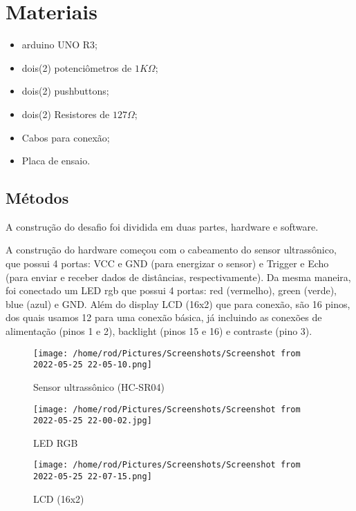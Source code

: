 \documentclass[conference]{IEEEtran}
\begin{document}
\section{Materiais}
 \begin{itemize}
     \item arduino UNO R3;
     \item dois(2) potenciômetros de $ 1K\Omega $;
     \item dois(2) pushbuttons;
     \item dois(2) Resistores de $ 127\Omega $;
     \item Cabos para conexão;
     \item Placa de ensaio.
 \end{itemize}

\subsection{Métodos}
A construção do desafio foi dividida em duas partes, hardware e software. 

A construção do hardware começou com o cabeamento do sensor ultrassônico, que possui 4 portas: VCC e GND (para
energizar o sensor) e Trigger e Echo (para enviar e receber dados de distâncias, respectivamente). Da mesma maneira,
foi conectado um LED rgb que possui 4 portas: red (vermelho), green (verde), blue (azul) e GND. Além do display LCD (16x2)
que para conexão, são 16 pinos, dos quais usamos 12 para uma conexão básica, já incluindo as conexões de alimentação (pinos 1 e 2),
 backlight (pinos 15 e 16) e contraste (pino 3).

 \begin{figure}[htbp]
    \centerline{\texttt{[image: /home/rod/Pictures/Screenshots/Screenshot from 2022-05-25 22-05-10.png]}}
    \caption{Sensor ultrassônico (HC-SR04)}
    \label{fig}
    \end{figure}

    \begin{figure}[htbp]
        \centerline{\texttt{[image: /home/rod/Pictures/Screenshots/Screenshot from 2022-05-25 22-00-02.jpg]}}
        \caption{LED RGB}
        \label{fig}
        \end{figure}

        \begin{figure}[htbp]
            \centerline{\texttt{[image: /home/rod/Pictures/Screenshots/Screenshot from 2022-05-25 22-07-15.png]}}
            \caption{LCD (16x2)}
            \label{fig}
            \end{figure}
\end{document}
